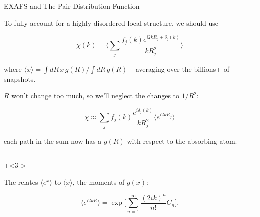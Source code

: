 \begin{slide}{EXAFS and The Pair Distribution Function}


  \begin{cenpage}{135mm}
  To fully account for a highly disordered local structure, we should use

\[
    \chi(k)  = \Biggl\langle \sum_j {\frac{f_j(k)e^{i2kR_j + \delta_j(k)}}{kR_j^2}} \Biggr\rangle
\]

where $ \langle x \rangle = \int dR\, x \, g(R) / \int dR\, g(R) $ --
averaging over the billions+ of snapshots.

\vmm\pause
$R$ won't change too much, so we'll neglect the changes to $1/R^2$:

\[
  \chi \approx
  \sum_j {f_j(k){\frac{e^{ i\delta_j(k)} }{kR_j^2}}}   \biggl\langle e^{i2kR_j}  \biggr\rangle
\]

each path in the sum now has a $g(R)$ with respect to the absorbing atom.

\vmm \hrule \vmm \onslide+<3->

The {} relates $\langle e^x\rangle$ to $\langle x \rangle$, the moments of $g(x)$:


\[ \biggl\langle e^{i2kR} \biggr\rangle
= \exp \bigg[ \sum_{n=1}^{\infty} { \frac{(2ik)^n}{n!}}C_n  \bigg].
\]



\vfill
\end{cenpage}
\end{slide}

